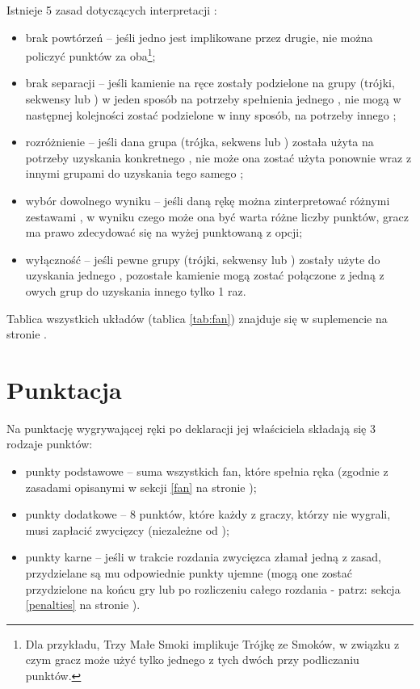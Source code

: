 Istnieje 5 zasad dotyczących interpretacji :
\begin{itemize}
  \item brak powtórzeń -- jeśli jedno  jest implikowane przez
  drugie, nie można policzyć punktów za oba\footnote{Dla przykładu,
   Trzy Małe Smoki implikuje Trójkę ze Smoków, w związku z
  czym gracz może użyć tylko jednego z tych dwóch  przy podliczaniu
  punktów.};
  \item brak separacji -- jeśli kamienie na ręce zostały podzielone na grupy
  (trójki, sekwensy lub ) w jeden sposób na potrzeby spełnienia
  jednego , nie mogą w następnej kolejności zostać podzielone w inny
  sposób, na potrzeby innego ;
  \item rozróżnienie -- jeśli dana grupa (trójka, sekwens lub )
  została użyta na potrzeby uzyskania konkretnego , nie może ona
  zostać użyta ponownie wraz z innymi grupami do uzyskania tego samego
  ;
  \item wybór dowolnego wyniku -- jeśli daną rękę można zinterpretować różnymi
  zestawami , w wyniku czego może ona być warta różne liczby
  punktów, gracz ma prawo zdecydować się na wyżej punktowaną z opcji;
  \item wyłączność -- jeśli pewne grupy (trójki, sekwensy lub )
  zostały użyte do uzyskania jednego , pozostałe kamienie mogą
  zostać połączone z jedną z owych grup do uzyskania innego  tylko 1
  raz.
\end{itemize}

Tablica wszystkich układów (tablica \ref{tab:fan}) znajduje się w suplemencie na stronie \pageref{tab:fan2}.

\section{Punktacja}
\label{punktacja}
Na punktację wygrywającej ręki po deklaracji  jej właściciela
składają się 3 rodzaje punktów: 
\begin{itemize}
  \item punkty podstawowe -- suma wszystkich fan, które spełnia ręka (zgodnie z
  zasadami opisanymi w sekcji \ref{fan} na stronie \pageref{fan});
  \item punkty dodatkowe -- 8 punktów, które każdy z graczy, którzy nie wygrali,
  musi zapłacić zwycięzcy (niezależne od );
  \item punkty karne -- jeśli w trakcie rozdania zwycięzca złamał jedną z zasad,
  przydzielane są mu odpowiednie punkty ujemne (mogą one zostać przydzielone na
  końcu gry lub po rozliczeniu całego rozdania - patrz: sekcja
  \ref{penalties} na stronie \pageref{penalties}).
\end{itemize}

